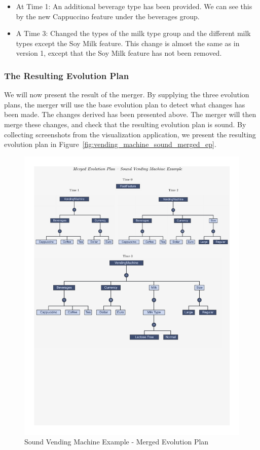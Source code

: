 \documentclass[a4paper,english]{ifimaster}
\begin{document}
\begin{itemize}
  \item At Time 1: An additional beverage type has been provided. We can see this by the new Cappuccino feature under the beverages group.
  \item A Time 3: Changed the types of the milk type group and the different milk types except the Soy Milk feature. This change is almost the same as in version 1, except that the Soy Milk feature has not been removed.
\end{itemize}

\subsubsection{The Resulting Evolution Plan}%
\label{ssub:the_resulting_evolution_plan}

We will now present the result of the merger. By supplying the three evolution plans, the merger will use the base evolution plan to detect what changes has been made. The changes derived has been presented above. The merger will then merge these changes, and check that the resulting evolution plan is sound. By collecting screenshots from the visualization application, we present the resulting evolution plan in Figure~\vref{fig:vending_machine_sound_merged_ep}.

\begin{figure}[htpb]
  \centering
  \includegraphics[width=\linewidth]{vending_machine/merged_sound.pdf}
  \caption{Sound Vending Machine Example - Merged Evolution Plan}%
  \label{fig:vending_machine_sound_merged_ep}
\end{figure}
\end{document}
